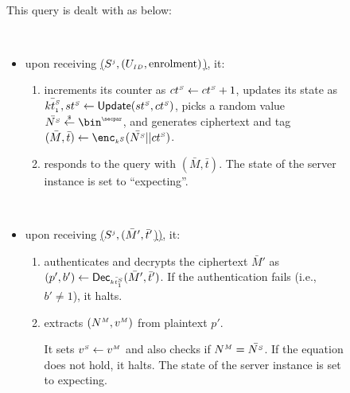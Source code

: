 \begin{figure}[H]
\setlength{\fboxsep}{1.2pt}
\begin{center}
    \begin{tcolorbox}[enhanced,width=3.3in, left=0.1cm,
    drop fuzzy shadow southwest,
    colframe=black,colback=white]
{\small{

 \\
 
 This query is dealt with as below: 
 
 \
 \begin{itemize}[leftmargin=.4cm]
 \item upon receiving  \underline{\send($S^{\scriptscriptstyle j}, (U_{\scriptscriptstyle ID},  \text{enrolment})$)}, it:
 \begin{enumerate}
 \item  increments its counter as ${ct}^{\scriptscriptstyle S} \gets {ct}^{\scriptscriptstyle S} + 1$, updates its state as $\bar{{kt}^{\scriptscriptstyle S}_{\scriptscriptstyle 1}}, {st}^{\scriptscriptstyle S} \gets \mathsf{Update}({st}^{\scriptscriptstyle S}, {ct}^{\scriptscriptstyle S})$, picks a random value $\bar{\VS{\nonce}} \stackrel{\sss\$}\leftarrow \bin^{\sss\secpar}$, and generates ciphertext and tag   $(\bar M,\bar t) \gets \enc_{\sss\VS{k}}(\bar{\VS{\nonce}}|| \VS{\counter})$. 
 
 \item responds to the query with $(\bar M,\bar t)$. The state of the server instance is set to ``expecting''.
 \end{enumerate}
 
 \
 
 \item upon receiving  \underline{\send($S^{\scriptscriptstyle j}, (\bar M',  \bar t'$))}, it:
 \begin{enumerate}
 \item authenticates and decrypts the ciphertext $\bar M'$ as $(p', b') \gets \mathsf{Dec}_{\scriptscriptstyle\bar{{kt}^{\scriptscriptstyle S}_{\scriptscriptstyle 1}}}(\bar M', \bar t')$. If the authentication fails (i.e., $b'\neq 1$), it halts. 
\item    extracts $({N}^{\scriptscriptstyle M}, {v}^{\scriptscriptstyle M})$ from plaintext $p'$. 

It sets ${v}^{\scriptscriptstyle S}\gets{v}^{\scriptscriptstyle M}$ and also  checks if ${N}^{\scriptscriptstyle M}=\bar{{N}^{\scriptscriptstyle S}}$. If the equation does not hold, it halts. The state of the server instance is set to expecting.
 \end{enumerate}
 

\end{itemize}}}
\end{tcolorbox}
\end{center}
\end{figure}
